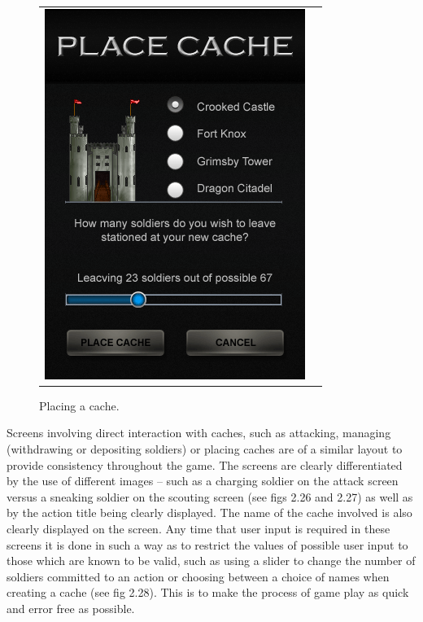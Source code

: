 \begin{figure}[h!]
\begin{tabular}{cc}
\begin{minipage}{0.3\textwidth}
\begin{center}
\begin{minipage}{0.83\textwidth}
		\includegraphics[width=\textwidth]{images/place_cache_mockup}
	\caption{Placing a cache.}
		\label{placing_cache}
		\end{minipage}
		\end{center}
	\end{minipage}
\end{tabular}
\vspace{-0pt}
\end{figure}

 Screens involving direct interaction with caches, such as attacking, managing (withdrawing or depositing soldiers) or placing caches are of a similar layout to provide consistency throughout the game. The screens are clearly differentiated by the use of different images – such as a charging soldier on the attack screen versus a sneaking soldier on the scouting screen (see figs 2.26 and 2.27) as well as by the action title being clearly displayed. The name of the cache involved is also clearly displayed on the screen. Any time that user input is required in these screens it is done in such a way as to restrict the values of possible user input to those which are known to be valid, such as using a slider to change the number of soldiers committed to an action or choosing between a choice of names when creating a cache (see fig 2.28). This is to make the process of game play as quick and error free as possible.

